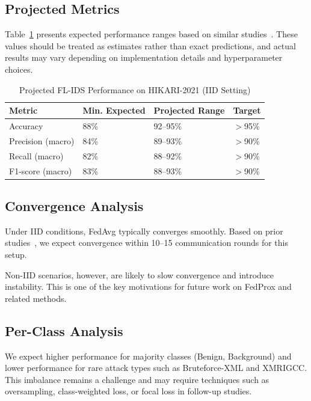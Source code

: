 \documentclass[conference]{IEEEtran}
\begin{document}
\subsection{Projected Metrics}

Table~\ref{tab:projected_metrics} presents expected performance ranges based on similar studies~\cite{sun2023,liu2023,gao2023}. These values should be treated as estimates rather than exact predictions, and actual results may vary depending on implementation details and hyperparameter choices.

\begin{table}[h]
\centering
\caption{Projected FL-IDS Performance on HIKARI-2021 (IID Setting)}
\label{tab:projected_metrics}
\begin{tabular}{llll}
\hline
\textbf{Metric}         & \textbf{Min. Expected} & \textbf{Projected Range} & \textbf{Target} \\
\hline
Accuracy                & 88\%  & 92--95\%  & $>$95\% \\
Precision (macro)       & 84\%  & 89--93\%  & $>$90\% \\
Recall (macro)          & 82\%  & 88--92\%  & $>$90\% \\
F1-score (macro)        & 83\%  & 88--93\%  & $>$90\% \\
\hline
\end{tabular}
\end{table}

\subsection{Convergence Analysis}

Under IID conditions, FedAvg typically converges smoothly. Based on prior studies~\cite{mcmahan2017,li2022}, we expect convergence within 10--15 communication rounds for this setup.

Non-IID scenarios, however, are likely to slow convergence and introduce instability. This is one of the key motivations for future work on FedProx and related methods.

\subsection{Per-Class Analysis}

We expect higher performance for majority classes (Benign, Background) and lower performance for rare attack types such as Bruteforce-XML and XMRIGCC. This imbalance remains a challenge and may require techniques such as oversampling, class-weighted loss, or focal loss in follow-up studies.
\end{document}
